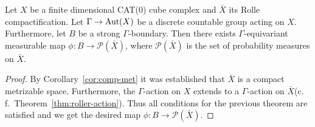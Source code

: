 \begin{cor}
  \label{cor:p(x)}
  Let \(X\) be a finite dimensional CAT(0) cube complex and \(\bar X\) its Rolle compactification. Let \(\Gamma \to \operatorname{Aut}(X)\) be a discrete countable group acting on \(X\). Furthermore, let \(B\) be a strong \(\Gamma\)-boundary. Then there exists \(\Gamma\)-equivariant measurable map \(\phi\colon B \to \mathcal{P}(\bar X)\), where \(\mathcal{P}(\bar X)\) is the set of probability measures on \(\bar X\).
\end{cor}

\begin{proof}
  By Corollary~\ref{cor:comp-met} it was established that \(\bar X\) is a compact metrizable space. Furthermore, the \(\Gamma\)-action on \(X\) extends to a \(\Gamma\)-action on \(\bar X\)(c.\,f.\ Theorem~\ref{thm:roller-action}). Thus all conditions for the previous theorem are satisfied and we get the desired map \(\phi\colon B \to \mathcal{P}(\bar X)\).
\end{proof}

